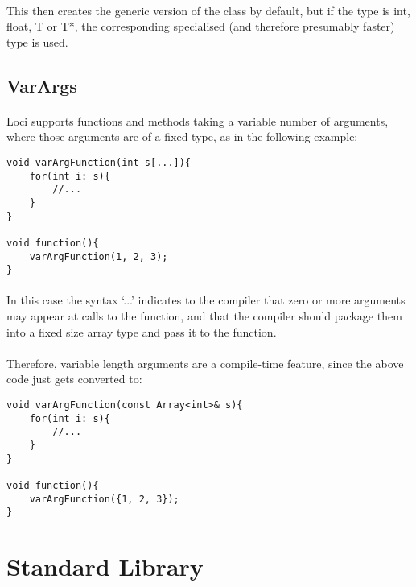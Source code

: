 \documentclass[12pt,twoside,notitlepage]{report}
\begin{document}
\paragraph{}
This then creates the generic version of the class by default, but if the type is int, float, T or T*, the corresponding specialised (and therefore presumably faster) type is used.

\clearpage

\subsection{VarArgs}

\paragraph{}
Loci supports functions and methods taking a variable number of arguments, where those arguments are of a fixed type, as in the following example:


\begin{lstlisting}
void varArgFunction(int s[...]){
	for(int i: s){
		//...
	}
}

void function(){
	varArgFunction(1, 2, 3);
}
\end{lstlisting}


\paragraph{}
In this case the syntax `...' indicates to the compiler that zero or more arguments may appear at calls to the function, and that the compiler should package them into a fixed size array type and pass it to the function.

\paragraph{}
Therefore, variable length arguments are a compile-time feature, since the above code just gets converted to:


\begin{lstlisting}
void varArgFunction(const Array<int>& s){
	for(int i: s){
		//...
	}
}

void function(){
	varArgFunction({1, 2, 3});
}
\end{lstlisting}


\clearpage

\section{Standard Library}
\end{document}
